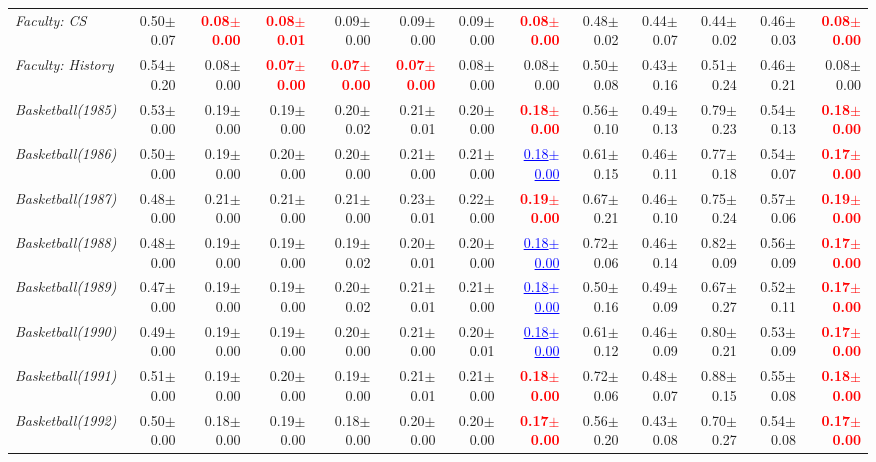\documentclass[nohyperref]{article}
\theoremstyle{plain}
\theoremstyle{definition}
\theoremstyle{remark}
\newcommand{\red}[1]{\textcolor{red}{\textbf{#1}}}
\newcommand{\blue}[1]{\textcolor{blue}{\underline{#1}}}
\begin{document}
\begin{table*}[!ht]
{\begin{tabular}{lrr|rrrrr|rrrrr}
			{\it Faculty: CS} & 0.50$\pm$0.07 & \red{0.08$\pm$0.00} & \red{0.08$\pm$0.01} & 0.09$\pm$0.00 & 0.09$\pm$0.00 & 0.09$\pm$0.00 & \red{0.08$\pm$0.00} & 0.48$\pm$0.02 & 0.44$\pm$0.07 & 0.44$\pm$0.02 & 0.46$\pm$0.03 & \red{0.08$\pm$0.00} \\
			{\it Faculty: History} & 0.54$\pm$0.20 & 0.08$\pm$0.00 & \red{0.07$\pm$0.00} & \red{0.07$\pm$0.00} & \red{0.07$\pm$0.00} & 0.08$\pm$0.00 & 0.08$\pm$0.00 & 0.50$\pm$0.08 & 0.43$\pm$0.16 & 0.51$\pm$0.24 & 0.46$\pm$0.21 & 0.08$\pm$0.00 \\
			{\it Basketball(1985)} & 0.53$\pm$0.00 & 0.19$\pm$0.00 & 0.19$\pm$0.00 & 0.20$\pm$0.02 & 0.21$\pm$0.01 & 0.20$\pm$0.00 & \red{0.18$\pm$0.00} & 0.56$\pm$0.10 & 0.49$\pm$0.13 & 0.79$\pm$0.23 & 0.54$\pm$0.13 & \red{0.18$\pm$0.00} \\
			{\it Basketball(1986)} & 0.50$\pm$0.00 & 0.19$\pm$0.00 & 0.20$\pm$0.00 & 0.20$\pm$0.00 & 0.21$\pm$0.00 & 0.21$\pm$0.00 & \blue{0.18$\pm$0.00} & 0.61$\pm$0.15 & 0.46$\pm$0.11 & 0.77$\pm$0.18 & 0.54$\pm$0.07 & \red{0.17$\pm$0.00} \\
			{\it Basketball(1987)} & 0.48$\pm$0.00 & 0.21$\pm$0.00 & 0.21$\pm$0.00 & 0.21$\pm$0.00 & 0.23$\pm$0.01 & 0.22$\pm$0.00 & \red{0.19$\pm$0.00} & 0.67$\pm$0.21 & 0.46$\pm$0.10 & 0.75$\pm$0.24 & 0.57$\pm$0.06 & \red{0.19$\pm$0.00} \\
			{\it Basketball(1988)} & 0.48$\pm$0.00 & 0.19$\pm$0.00 & 0.19$\pm$0.00 & 0.19$\pm$0.02 & 0.20$\pm$0.01 & 0.20$\pm$0.00 & \blue{0.18$\pm$0.00} & 0.72$\pm$0.06 & 0.46$\pm$0.14 & 0.82$\pm$0.09 & 0.56$\pm$0.09 & \red{0.17$\pm$0.00} \\
			{\it Basketball(1989)} & 0.47$\pm$0.00 & 0.19$\pm$0.00 & 0.19$\pm$0.00 & 0.20$\pm$0.02 & 0.21$\pm$0.01 & 0.21$\pm$0.00 & \blue{0.18$\pm$0.00} & 0.50$\pm$0.16 & 0.49$\pm$0.09 & 0.67$\pm$0.27 & 0.52$\pm$0.11 & \red{0.17$\pm$0.00} \\
			{\it Basketball(1990)} & 0.49$\pm$0.00 & 0.19$\pm$0.00 & 0.19$\pm$0.00 & 0.20$\pm$0.00 & 0.21$\pm$0.00 & 0.20$\pm$0.01 & \blue{0.18$\pm$0.00} & 0.61$\pm$0.12 & 0.46$\pm$0.09 & 0.80$\pm$0.21 & 0.53$\pm$0.09 & \red{0.17$\pm$0.00} \\
			{\it Basketball(1991)} & 0.51$\pm$0.00 & 0.19$\pm$0.00 & 0.20$\pm$0.00 & 0.19$\pm$0.00 & 0.21$\pm$0.01 & 0.21$\pm$0.00 & \red{0.18$\pm$0.00} & 0.72$\pm$0.06 & 0.48$\pm$0.07 & 0.88$\pm$0.15 & 0.55$\pm$0.08 & \red{0.18$\pm$0.00} \\
			{\it Basketball(1992)} & 0.50$\pm$0.00 & 0.18$\pm$0.00 & 0.19$\pm$0.00 & 0.18$\pm$0.00 & 0.20$\pm$0.00 & 0.20$\pm$0.00 & \red{0.17$\pm$0.00} & 0.56$\pm$0.20 & 0.43$\pm$0.08 & 0.70$\pm$0.27 & 0.54$\pm$0.08 & \red{0.17$\pm$0.00} \\

\end{tabular}}
\end{table*}
\end{document}
